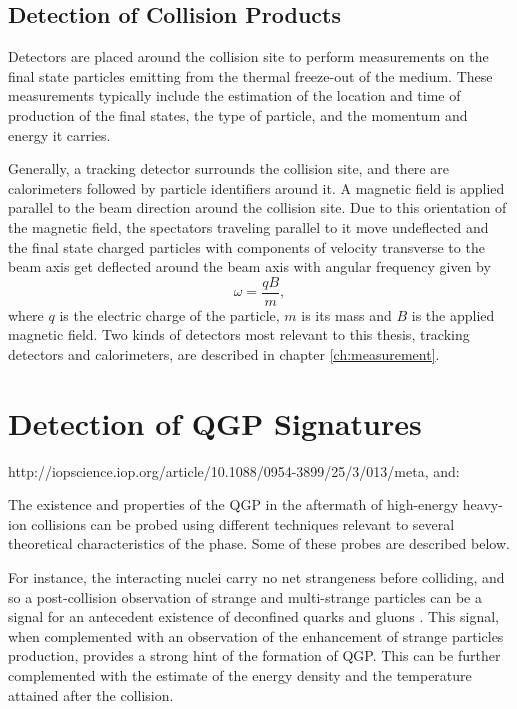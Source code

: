 \subsection{Detection of Collision Products}\label{subsection:detection}
Detectors are placed around the collision site to perform measurements on the final state particles emitting from the thermal freeze-out of the medium. These measurements typically include the estimation of the location and time of production of the final states, the type of particle, and the momentum and energy it carries.

Generally, a tracking detector surrounds the collision site, and there are calorimeters followed by particle identifiers around it. A magnetic field is applied parallel to the beam direction around the collision site. Due to this orientation of the magnetic field, the spectators traveling parallel to it move undeflected and the final state charged particles with components of velocity transverse to the beam axis get deflected around the beam axis with angular frequency given by
\begin{equation}\label{eqn:larmor}
\omega = \frac{qB}{m},
\end{equation}
where $q$ is the electric charge of the particle, $m$ is its mass and $B$ is the applied magnetic field.
Two kinds of detectors most relevant to this thesis, tracking detectors and calorimeters, are described in chapter \ref{ch:measurement}.

\section{Detection of QGP Signatures}\label{section:signatures}
http://iopscience.iop.org/article/10.1088/0954-3899/25/3/013/meta, and: 

The existence and properties of the QGP in the aftermath of high-energy heavy-ion collisions can be probed using different techniques relevant to several theoretical characteristics of the phase. Some of these probes are described below.

For instance, the interacting nuclei  carry no net strangeness before colliding, and so a post-collision observation of strange and multi-strange particles can be a signal for an antecedent existence of deconfined quarks and gluons \cite{1742-6596-455-1-012005}. This signal, when complemented with an observation of the enhancement of strange particles production, provides a strong hint of the formation of QGP. This can be further complemented with the estimate of the energy density and the temperature attained after the collision.

